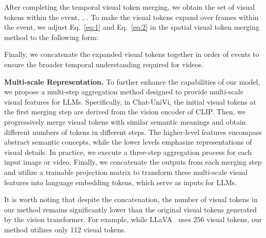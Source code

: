 \documentclass[10pt,twocolumn,letterpaper]{article}
\newcommand{\myparagraph}[1]{\textbf{#1}\hspace{1.8ex}}
\begin{document}
After completing the temporal visual token merging, we obtain the set of visual tokens within the event, \ie, . To make the visual tokens expand over frames within the event, we adjust Eq.~\ref{eq:1} and Eq.~\ref{eq:2} in the spatial visual token merging method to the following form:

Finally, we concatenate the expanded visual tokens together in order of events to ensure the broader temporal understanding required for videos.

\noindent \myparagraph{Multi-scale Representation.} 
To further enhance the capabilities of our model, we propose a multi-step aggregation method designed to provide multi-scale visual features for LLMs. Specifically, in Chat-UniVi, the initial visual tokens at the first merging step are derived from the vision encoder of CLIP. Then, we progressively merge visual tokens with similar semantic meanings and obtain different numbers of tokens in different steps. The higher-level features encompass abstract semantic concepts, while the lower levels emphasize representations of visual details. In practice, we execute a three-step aggregation process for each input image or video. Finally, we concatenate the outputs from each merging step and utilize a trainable projection matrix  to transform these multi-scale visual features into language embedding tokens, which serve as inputs for LLMs.

It is worth noting that despite the concatenation, the number of visual tokens in our method remains significantly lower than the original visual tokens generated by the vision transformer. For example, while LLaVA~\cite{liu2023visual} uses 256 visual tokens, our method utilizes only 112 visual tokens.
\end{document}
